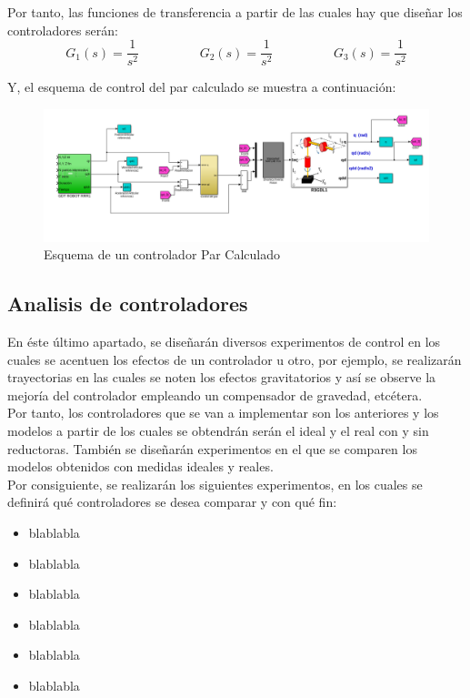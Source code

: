 	Por tanto, las funciones de transferencia a partir de las cuales hay que diseñar los controladores serán:
	\begin{equation}
		G_{1}(s)=\frac{1}{s^{2}} \hspace{2cm} G_{2}(s)=\frac{1}{s^{2}} \hspace{2cm} G_{3}(s)=\frac{1}{s^{2}}
	\end{equation}

	Y, el esquema de control del par calculado se muestra a continuación:

		\begin{figure}[h!]
			\centering
			\includegraphics[width=.8\textwidth]{montaje_parcalcul}
			\caption{Esquema de un controlador Par Calculado}
		\end{figure}


	\subsection{Analisis de controladores}
En éste último apartado, se diseñarán diversos experimentos de control en los cuales se acentuen los efectos de un controlador u otro, por ejemplo, se realizarán trayectorias en las cuales se noten los efectos gravitatorios y así se observe la mejoría del controlador empleando un compensador de gravedad, etcétera.\\
Por tanto, los controladores que se van a implementar son los anteriores y los modelos a partir de los cuales se obtendrán serán el ideal y el real con y sin reductoras. También se diseñarán experimentos en el que se comparen los modelos obtenidos con medidas ideales y reales.\\

Por consiguiente, se realizarán los siguientes experimentos, en los cuales se definirá qué controladores se desea comparar y con qué fin:
\begin{itemize}
	\item blablabla \\
	\item blablabla \\
	\item blablabla \\
	\item blablabla \\
	\item blablabla \\
	\item blablabla \\	
\end{itemize}
